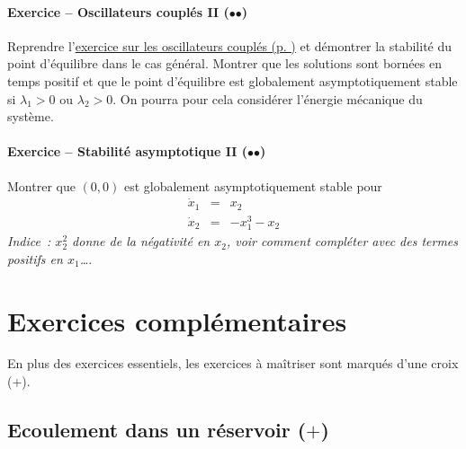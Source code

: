\hypertarget{ressort-2}{%
\subsubsection*{\texorpdfstring{Exercice -- Oscillateurs couplés II
(\(\mathord{\bullet}\mathord{\bullet}\))}{Exercice -- Oscillateurs couplés II (••)}}\label{ressort-2}}


Reprendre l'\protect\hyperlink{ressort-1}{exercice sur les oscillateurs
couplés (p. \pageref*{ressort-1})} et démontrer la stabilité du point
d'équilibre dans le cas général. Montrer que les solutions sont bornées
en temps positif et que le point d'équilibre est globalement
asymptotiquement stable si \(\lambda_1>0\) ou \(\lambda_2>0\). On pourra
pour cela considérer l'énergie mécanique du système.

\hypertarget{asymp_glob-2}{%
\subsubsection*{\texorpdfstring{Exercice -- Stabilité asymptotique II
(\(\mathord{\bullet}\mathord{\bullet}\))}{Exercice -- Stabilité asymptotique II (••)}}\label{asymp_glob-2}}


Montrer que \((0,0)\) est globalement asymptotiquement stable pour \[
\begin{array}{rcl}
\dot{x}_1 &=& x_2\\
\dot{x}_2 &=& -x_1^3-x_2
\end{array}
\] \emph{Indice~: \(x_2^2\) donne de la négativité en \(x_2\), voir
comment compléter avec des termes positifs en \(x_1\)\ldots{}}.

\hypertarget{exercices-compluxe9mentaires}{%
\chapter{Exercices complémentaires}\label{exercices-compluxe9mentaires}}

En plus des exercices essentiels, les exercices à maîtriser sont marqués
d'une croix (+).

\hypertarget{exo_Torricelli}{%
\section{\texorpdfstring{Ecoulement dans un réservoir
(\(+\))}{Ecoulement dans un réservoir (+)}}\label{exo_Torricelli}}

